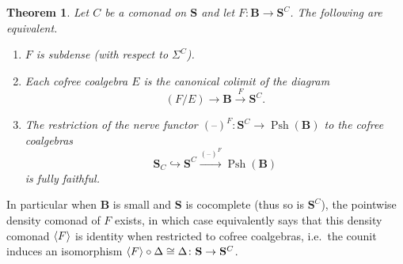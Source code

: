 \documentclass[11pt, oneside, article]{memoir}
\theoremstyle{plain}
\newtheorem{theorem}{Theorem}[section]
\theoremstyle{definition}
\theoremstyle{remark}
\DeclareMathOperator{\Psh}{Psh}
\DeclarePairedDelimiter{\gen}{\langle}{\rangle}
\newcommand{\dash}{{\mathord{\text{--}}}}
\newcommand{\xto}[1]{\xrightarrow{#1}}
\newcommand{\cat}[1]{\mathbf{#1}}
\newcommand{\CoalgOn}[2]{{#2}^{#1}}
\newcommand{\CoalgS}[1]{\CoalgOn{#1}{\bS}}
\newcommand{\KlOn}[2]{{#2}_{#1}}
\newcommand{\KlS}[1]{\KlOn{#1}{\bS}}
\newcommand{\nerve}[1]{(\dash)^{#1}}
\newcommand{\carr}{\Sigma}
\newcommand{\rcarr}{\Delta}
\newcommand{\car}[1]{\carr^{#1}}
\newcommand{\carC}{\car{\cC}}
\newcommand{\Ps}[1]{\Psh(#1)}
\newcommand{\cmnd}[1]{{#1}}
\newcommand{\eE}{E}
\newcommand{\cC}{\cmnd{C}}
\newcommand{\bB}{\cat{B}}
\newcommand{\bS}{\cat{S}}
\newcommand{\CS}{\CoalgS{\cC}}
\newcommand{\KlCS}{\KlS{\cC}}
\newcommand{\anoteNI}[1]{}
\begin{document}
\anoteNI{I have a feeling this would be clarified by the theory of
  relative (co)monads. Is there a notion of relative density comonad?}

\begin{theorem}\label{prop:subbasis}
  Let $\cC$ be a comonad on $\bS$ and let
  $F \colon \bB \to \CS$. The following are equivalent.
  \begin{enumerate}[label=(\roman*)]
  \item\label{item:subbasis} $F$ is subdense (with respect to $\carC$).
  \item\label{item:subdensity} Each cofree coalgebra $\eE$ is the
    canonical colimit of the diagram
    \[(F / \eE) \to \bB \xto{F} \CS.\]
  \item\label{item:subdense} The restriction of the nerve functor
    $\nerve{F} \colon \CS \to \Ps{\bB}$ to the cofree coalgebras
    \[\KlCS \hookrightarrow \CS
      \xto{\nerve{F}} \Ps{\bB}\] is fully faithful.
  \end{enumerate} 
\end{theorem}

In particular when $\bB$ is small and $\bS$ is cocomplete (thus so is
$\CS$), the pointwise density comonad of $F$ exists, in
which case  equivalently says that this
density comonad $\gen{F}$ is identity when restricted to cofree
coalgebras, i.e.\ the counit induces an isomorphism
$\gen{F} \circ \rcarr \cong \rcarr \colon \bS \to \CS$.
\end{document}
